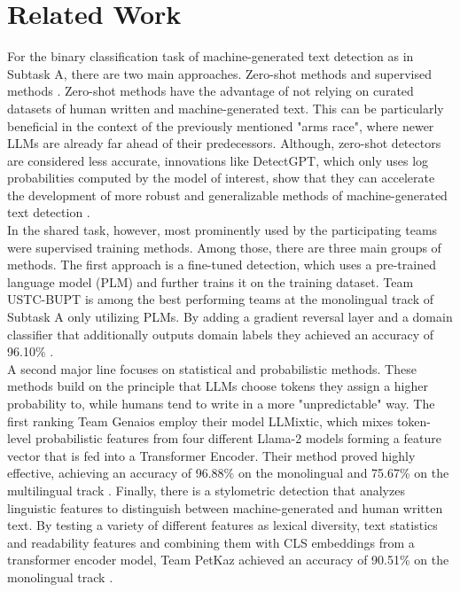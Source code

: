 \documentclass[11pt]{article}
\begin{document}
\section{Related Work}
For the binary classification task of machine-generated text detection as in Subtask A, there are two main 
approaches. Zero-shot methods and supervised methods \cite{wang2024semeval}. Zero-shot methods have the advantage of 
not relying on curated datasets of human written and machine-generated text. This can be particularly beneficial in 
the context of the previously mentioned "arms race", where newer LLMs are already far ahead of their predecessors.
Although, zero-shot detectors are considered less accurate, innovations like DetectGPT, which only uses log 
probabilities computed by the model of interest, show that they can accelerate the development of more robust and 
generalizable methods of machine-generated text detection \cite{mitchell2023detectgpt}. \\
In the shared task, however, most prominently used by the participating teams were supervised training methods.
Among those, there are three main groups of methods. The first approach is a fine-tuned detection, which uses a 
pre-trained language model (PLM) and further trains it on the training dataset. Team USTC-BUPT is among the best performing 
teams at the monolingual track of Subtask A only utilizing PLMs. By adding a gradient reversal layer and 
a domain classifier that additionally outputs domain labels they achieved an accuracy of 96.10\% \cite{guo2024ustc}.\\ 
A second major line focuses on statistical and probabilistic methods. These methods build on the principle that LLMs choose tokens
they assign a higher probability to, while humans tend to write in a more "unpredictable" way.
The first ranking Team Genaios employ their model LLMixtic, which mixes token-level probabilistic features from 
four different Llama-2 models forming a feature vector that is fed into a Transformer Encoder. Their method proved 
highly effective, achieving an accuracy of 96.88\% on the monolingual and 75.67\% on the multilingual track \cite{sarvazyan2024genaios}.
Finally, there is a stylometric detection that analyzes linguistic features to distinguish between machine-generated
and human written text. By testing a variety of different features as lexical diversity, text statistics and readability
features and combining them with CLS embeddings from a transformer encoder model, Team PetKaz achieved an accuracy 
of 90.51\% on the monolingual track \cite{petukhova2024petkaz}.
\end{document}
